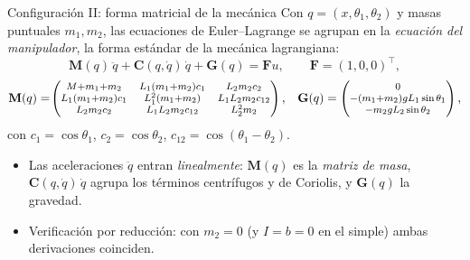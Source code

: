\documentclass[aspectratio=169,11pt]{beamer}
\begin{document}
\begin{frame}{Configuración II: forma matricial de la mecánica}
  Con $q=(x,\theta_1,\theta_2)$ y masas puntuales $m_1,m_2$, las ecuaciones de
  Euler--Lagrange se agrupan en la \emph{ecuaci\'on del manipulador}, la forma
  est\'andar de la mec\'anica lagrangiana:
  \[
    \mathbf{M}(q)\,\ddot q+\mathbf{C}(q,\dot q)\,\dot q+\mathbf{G}(q)=\bm{F}u,
    \qquad \bm F=(1,0,0)^\top,
  \]
  \[
  {\footnotesize
  \mathbf{M}(q)=\!\begin{pmatrix}
   M{+}m_1{+}m_2 & L_1(m_1{+}m_2)c_1 & L_2 m_2 c_2\\
   L_1(m_1{+}m_2)c_1 & L_1^2(m_1{+}m_2) & L_1L_2 m_2 c_{12}\\
   L_2 m_2 c_2 & L_1L_2 m_2 c_{12} & L_2^2 m_2
  \end{pmatrix},
  \quad
  \mathbf{G}(q)=\begin{pmatrix} 0\\ -(m_1{+}m_2)gL_1\sin\theta_1\\ -m_2 gL_2\sin\theta_2\end{pmatrix},}
  \]
  con $c_1=\cos\theta_1$, $c_2=\cos\theta_2$, $c_{12}=\cos(\theta_1{-}\theta_2)$.
  \vspace{0.3em}
  \begin{itemize}
    \small
    \item Las aceleraciones $\ddot q$ entran \emph{linealmente}: $\mathbf{M}(q)$
          es la \emph{matriz de masa}, $\mathbf{C}(q,\dot q)\,\dot q$ agrupa los
          t\'erminos centr\'ifugos y de Coriolis, y $\mathbf{G}(q)$ la gravedad.
    \item Verificaci\'on por reducci\'on: con $m_2=0$ (y $I=b=0$ en el simple)
          ambas derivaciones coinciden.
  \end{itemize}
\end{frame}
\end{document}
